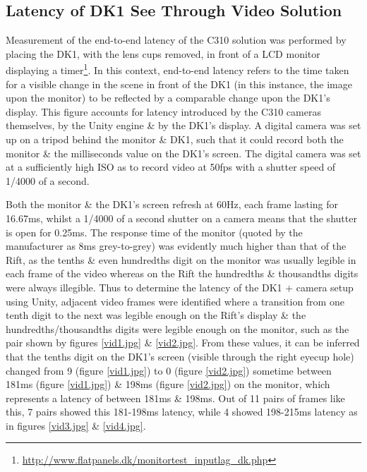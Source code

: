 
\subsection{Latency of DK1 See Through Video Solution}

Measurement of the end-to-end latency of the C310 solution was performed by placing the DK1, with the lens cups removed, in front of a LCD monitor displaying a timer\footnote{\url{http://www.flatpanels.dk/monitortest_inputlag_dk.php}}. In this context, end-to-end latency refers to the time taken for a visible change in the scene in front of the DK1 (in this instance, the image upon the monitor) to be reflected by a comparable change upon the DK1's display. This figure accounts for latency introduced by the C310 cameras themselves, by the Unity engine \& by the DK1's display. A digital camera was set up on a tripod behind the monitor \& DK1, such that it could record both the monitor \& the milliseconds value on the DK1's screen. The digital camera was set at a sufficiently high ISO as to record video at 50fps with a shutter speed of 1/4000 of a second.

Both the monitor \& the DK1's screen refresh at 60Hz, each frame lasting for 16.67ms, whilst a 1/4000 of a second shutter on a camera means that the shutter is open for 0.25ms. The response time of the monitor (quoted by the manufacturer as 8ms grey-to-grey) was evidently much higher than that of the Rift, as the tenths \& even hundredths digit on the monitor was usually legible in each frame of the video whereas on the Rift the hundredths \& thousandths digits were always illegible. Thus to determine the latency of the DK1 + camera setup using Unity, adjacent video frames were identified where a transition from one tenth digit to the next was legible enough on the Rift's display \& the hundredths/thousandths digits were legible enough on the monitor, such as the pair shown by figures \ref{vid1.jpg} \& \ref{vid2.jpg}. From these values, it can be inferred that the tenths digit on the DK1's screen (visible through the right eyecup hole) changed from 9 (figure \ref{vid1.jpg}) to 0 (figure \ref{vid2.jpg}) sometime between 181ms (figure \ref{vid1.jpg}) \& 198ms (figure \ref{vid2.jpg}) on the monitor, which represents a latency of between 181ms \& 198ms. Out of 11 pairs of frames like this, 7 pairs showed this 181-198ms latency, while 4 showed 198-215ms latency as in figures \ref{vid3.jpg} \& \ref{vid4.jpg}.

